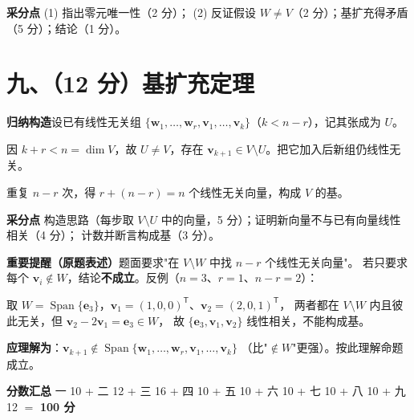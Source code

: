 \documentclass[11pt]{ctexart}
\newcommand{\Span}{\operatorname{Span}}
\newcommand{\TT}{^{\mathsf T}}
\begin{document}
\begin{scorebox}
\textbf{采分点}\quad
(1) 指出零元唯一性（2 分）；
(2) 反证假设 $W\ne V$（2 分）；基扩充得矛盾（5 分）；结论（1 分）。
\end{scorebox}

\section*{九、（12 分）基扩充定理}

\begin{ansbox}
\textbf{归纳构造}\quad 设已有线性无关组
$\{\mathbf w_1,\dots,\mathbf w_r,\mathbf v_1,\dots,\mathbf v_k\}$（$k<n-r$），记其张成为 $U$。

因 $k+r<n=\dim V$，故 $U\ne V$，存在 $\mathbf v_{k+1}\in V\setminus U$。把它加入后新组仍线性无关。

重复 $n-r$ 次，得 $r+(n-r)=n$ 个线性无关向量，构成 $V$ 的基。
\end{ansbox}

\begin{scorebox}
\textbf{采分点}\quad
构造思路（每步取 $V\setminus U$ 中的向量，5 分）；证明新向量不与已有向量线性相关（4 分）；
计数并断言构成基（3 分）。

\textbf{重要提醒（原题表述）}\quad 题面要求"在 $V\setminus W$ 中找 $n-r$ 个线性无关向量"。
若只要求每个 $\mathbf v_i\notin W$，结论\textbf{不成立}。反例（$n=3$、$r=1$、$n-r=2$）：

取 $W=\Span\{\mathbf e_3\}$，$\mathbf v_1=(1,0,0)\TT$、$\mathbf v_2=(2,0,1)\TT$，
两者都在 $V\setminus W$ 内且彼此无关，但 $\mathbf v_2-2\mathbf v_1=\mathbf e_3\in W$，
故 $\{\mathbf e_3,\mathbf v_1,\mathbf v_2\}$ 线性相关，不能构成基。

\textbf{应理解为}：$\mathbf v_{k+1}\notin\Span\{\mathbf w_1,\dots,\mathbf w_r,\mathbf v_1,\dots,\mathbf v_k\}$
（比"$\notin W$"更强）。按此理解命题成立。
\end{scorebox}

\vspace{0.3cm}
\begin{ansbox}
\textbf{分数汇总}\quad
一 10 + 二 12 + 三 16 + 四 10 + 五 10 + 六 10 + 七 10 + 八 10 + 九 12 $=$ \textbf{100 分}
\end{ansbox}
\end{document}
